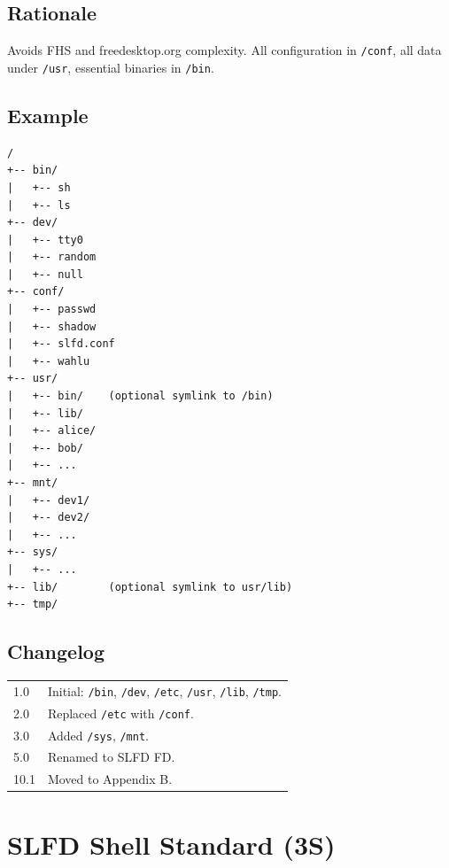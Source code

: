 \documentclass[12pt,a4paper]{article}
\begin{document}
\subsection{Rationale}
Avoids FHS and freedesktop.org complexity. All configuration in \texttt{/conf}, all data under \texttt{/usr}, essential binaries in \texttt{/bin}.

\subsection{Example}
\begin{lstlisting}
/
+-- bin/
|   +-- sh
|   +-- ls
+-- dev/
|   +-- tty0
|   +-- random
|   +-- null
+-- conf/
|   +-- passwd
|   +-- shadow
|   +-- slfd.conf
|   +-- wahlu
+-- usr/
|   +-- bin/    (optional symlink to /bin)
|   +-- lib/
|   +-- alice/
|   +-- bob/
|   +-- ...
+-- mnt/
|   +-- dev1/
|   +-- dev2/
|   +-- ...
+-- sys/
|   +-- ...
+-- lib/        (optional symlink to usr/lib)
+-- tmp/
\end{lstlisting}

\subsection{Changelog}
\begin{tabularx}{\textwidth}{|l|X|}
\hline
1.0 & Initial: \texttt{/bin}, \texttt{/dev}, \texttt{/etc}, \texttt{/usr}, \texttt{/lib}, \texttt{/tmp}. \\
2.0 & Replaced \texttt{/etc} with \texttt{/conf}. \\
3.0 & Added \texttt{/sys}, \texttt{/mnt}. \\
5.0 & Renamed to SLFD FD. \\
10.1 & Moved to Appendix B. \\
\hline
\end{tabularx}

\section{SLFD Shell Standard (3S)}
\label{app:3s}
\end{document}
